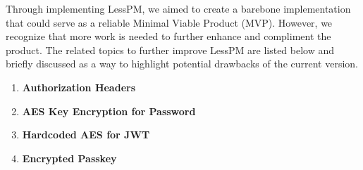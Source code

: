 Through implementing LessPM, we aimed to create a barebone implementation that could serve as a reliable Minimal
    Viable Product (MVP). However, we recognize that more work is needed to further enhance and compliment the product.
    The related topics to further improve LessPM are listed below and briefly discussed as a way to highlight
    potential drawbacks of the current version.

    \begin{enumerate}[label=$\blacktriangleright$]
        \item \textbf{Authorization Headers}
        \item \textbf{AES Key Encryption for Password}
        \item \textbf{Hardcoded AES for JWT}
        \item \textbf{Encrypted Passkey}
        \iffalse
        \item \textbf{Assign IP to JWT}
        \item
        \item \textbf{Credential ID} \newline In its current implementation, LessPM supports a single registered
        authenticator per username to maintain a focused security approach.
        During registration, the server checks the database for an existing username similar to the incoming one
        and aborts the registration ceremony if a match is found.
        While WebAuthn permits users to have multiple authenticators, limiting this feature in the initial iteration of
        LessPM helps ensure a more controlled security environment.
        As the system evolves, considering the addition of support for multiple authenticators can be weighed against
        potential security risks and benefits.
        \fi
    \end{enumerate}